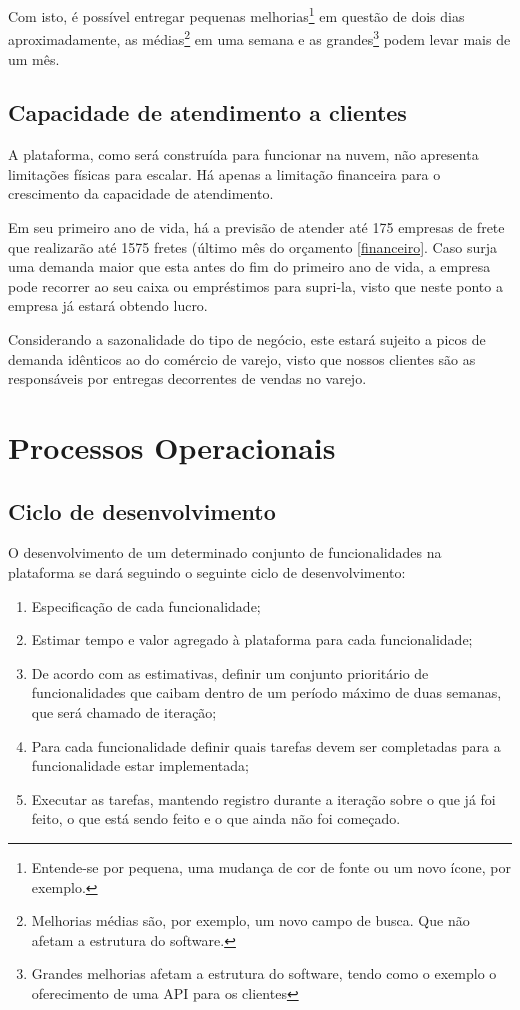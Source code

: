   Com isto, é possível entregar pequenas melhorias\footnote{Entende-se por pequena, uma mudança de cor de fonte ou um novo ícone, por exemplo.} em questão de dois dias aproximadamente, as médias\footnote{Melhorias médias são, por exemplo, um novo campo de busca. Que não afetam a estrutura do software.} em uma semana e as grandes\footnote{Grandes melhorias afetam a estrutura do software, tendo como o exemplo o oferecimento de uma API para os clientes} podem levar mais de um mês.
  
  \subsection{Capacidade de atendimento a clientes}
  A plataforma, como será construída para funcionar na nuvem, não apresenta limitações físicas para escalar. Há apenas a limitação financeira para o crescimento da capacidade de atendimento.
  
  Em seu primeiro ano de vida, há a previsão de atender até 175 empresas de frete que realizarão até 1575 fretes (último mês do orçamento \ref{financeiro}. Caso surja uma demanda maior que esta antes do fim do primeiro ano de vida, a empresa pode recorrer ao seu caixa ou empréstimos para supri-la, visto que neste ponto a empresa já estará obtendo lucro.
  
  Considerando a sazonalidade do tipo de negócio, este estará sujeito a picos de demanda idênticos ao do comércio de varejo, visto que nossos clientes são as responsáveis por entregas decorrentes de vendas no varejo.
  
\section{Processos Operacionais}
  \subsection{Ciclo de desenvolvimento}
  O desenvolvimento de um determinado conjunto de funcionalidades na plataforma se dará seguindo o seguinte ciclo de desenvolvimento:

  \begin{enumerate}
    \item Especificação de cada funcionalidade;
    \item Estimar tempo e valor agregado à plataforma para cada funcionalidade;
    \item De acordo com as estimativas, definir um conjunto prioritário de funcionalidades que caibam dentro de um período máximo de duas semanas, que será chamado de iteração;
    \item Para cada funcionalidade definir quais tarefas devem ser completadas para a funcionalidade estar implementada;
    \item Executar as tarefas, mantendo registro durante a iteração sobre o que já foi feito, o que está sendo feito e o que ainda não foi começado.
  \end{enumerate}

